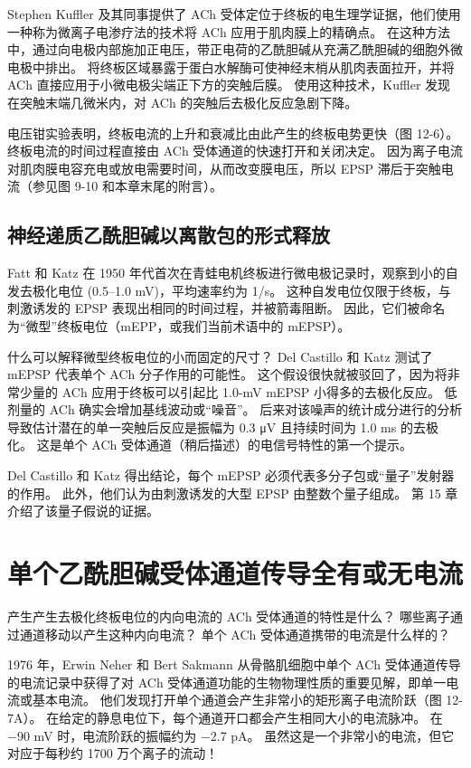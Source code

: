 Stephen Kuffler 及其同事提供了 ACh 受体定位于终板的电生理学证据，他们使用一种称为微离子电渗疗法的技术将 ACh 应用于肌肉膜上的精确点。 在这种方法中，通过向电极内部施加正电压，带正电荷的乙酰胆碱从充满乙酰胆碱的细胞外微电极中排出。 将终板区域暴露于蛋白水解酶可使神经末梢从肌肉表面拉开，并将 ACh 直接应用于小微电极尖端正下方的突触后膜。 使用这种技术，Kuffler 发现在突触末端几微米内，对 ACh 的突触后去极化反应急剧下降。

电压钳实验表明，终板电流的上升和衰减比由此产生的终板电势更快（图 12-6）。 终板电流的时间过程直接由 ACh 受体通道的快速打开和关闭决定。 因为离子电流对肌肉膜电容充电或放电需要时间，从而改变膜电压，所以 EPSP 滞后于突触电流（参见图 9-10 和本章末尾的附言）。


\subsection{神经递质乙酰胆碱以离散包的形式释放}

Fatt 和 Katz 在 1950 年代首次在青蛙电机终板进行微电极记录时，观察到小的自发去极化电位 (0.5–1.0 mV)，平均速率约为 1/s。 这种自发电位仅限于终板，与刺激诱发的 EPSP 表现出相同的时间过程，并被箭毒阻断。 因此，它们被命名为“微型”终板电位（mEPP，或我们当前术语中的 mEPSP）。

什么可以解释微型终板电位的小而固定的尺寸？ Del Castillo 和 Katz 测试了 mEPSP 代表单个 ACh 分子作用的可能性。 这个假设很快就被驳回了，因为将非常少量的 ACh 应用于终板可以引起比 1.0-mV mEPSP 小得多的去极化反应。 低剂量的 ACh 确实会增加基线波动或“噪音”。 后来对该噪声的统计成分进行的分析导致估计潜在的单一突触后反应是振幅为 0.3 μV 且持续时间为 1.0 ms 的去极化。 这是单个 ACh 受体通道（稍后描述）的电信号特性的第一个提示。

Del Castillo 和 Katz 得出结论，每个 mEPSP 必须代表多分子包或“量子”发射器的作用。 此外，他们认为由刺激诱发的大型 EPSP 由整数个量子组成。 第 15 章介绍了该量子假说的证据。


\section{单个乙酰胆碱受体通道传导全有或无电流}
产生产生去极化终板电位的内向电流的 ACh 受体通道的特性是什么？ 哪些离子通过通道移动以产生这种内向电流？ 单个 ACh 受体通道携带的电流是什么样的？

1976 年，Erwin Neher 和 Bert Sakmann 从骨骼肌细胞中单个 ACh 受体通道传导的电流记录中获得了对 ACh 受体通道功能的生物物理性质的重要见解，即单一电流或基本电流。 他们发现打开单个通道会产生非常小的矩形离子电流阶跃（图 12-7A）。 在给定的静息电位下，每个通道开口都会产生相同大小的电流脉冲。 在 −90 mV 时，电流阶跃的振幅约为 −2.7 pA。 虽然这是一个非常小的电流，但它对应于每秒约 1700 万个离子的流动！




